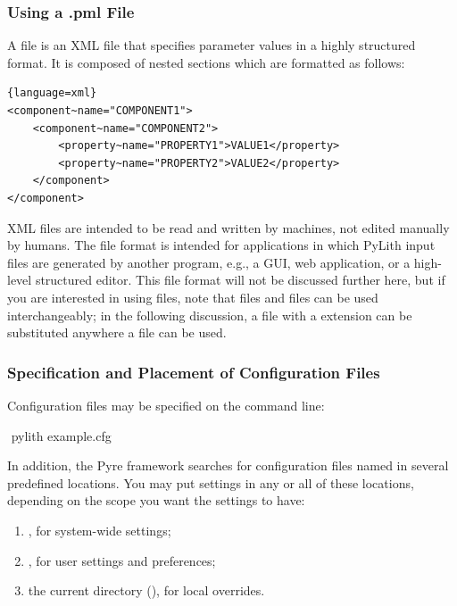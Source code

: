 \subsubsection{Using a {\ttfamily.pml} File}

A  file is an XML file that specifies parameter values
in a highly structured format. It is composed of nested sections which
are formatted as follows:
\begin{lstlisting}[basicstyle=\ttfamily,frame=tb]{language=xml}
<component~name="COMPONENT1">
    <component~name="COMPONENT2">
        <property~name="PROPERTY1">VALUE1</property>
        <property~name="PROPERTY2">VALUE2</property>
    </component>
</component>
\end{lstlisting}
XML files are intended to be read and written by machines, not edited
manually by humans. The  file format is intended for
applications in which PyLith input files are generated by another
program, e.g., a GUI, web application, or a high-level structured
editor. This file format will not be discussed further here, but if
you are interested in using  files, note that 
files and  files can be used interchangeably; in the
following discussion, a file with a  extension can be
substituted anywhere a  file can be used.


\subsubsection{Specification and Placement of Configuration Files}

Configuration files may be specified on the command line:
\begin{shell}
$$ pylith example.cfg
\end{shell}
In addition, the Pyre framework searches for configuration files named
 in several predefined locations. You may put
settings in any or all of these locations, depending on the scope
you want the settings to have:
\begin{enumerate}
\item {}, for system-wide settings;
\item {}, for user
  settings and preferences;
\item the current directory (), for local
  overrides.
\end{enumerate}


